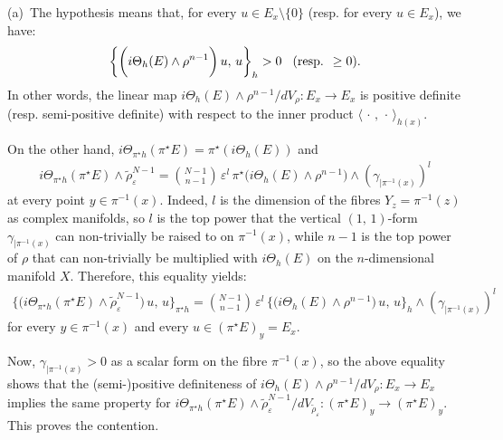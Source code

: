 \documentclass[12pt]{article}
\begin{document}
 (a)\, The hypothesis means that, for every $u\in E_x\setminus\{0\}$ (resp. for every $u\in E_x$), we have: \begin{eqnarray*}\bigg\{\bigg(i\Theta_h(E)\wedge\rho^{n-1}\bigg)\,u,\,u\bigg\}_h>0 \hspace{2ex} (\mbox{resp.} \hspace{1ex} \geq 0).\end{eqnarray*} In other words, the linear map $i\Theta_h(E)\wedge\rho^{n-1}/dV_\rho:E_x\longrightarrow E_x$ is positive definite (resp. semi-positive definite) with respect to the inner product $\langle\,\cdot\,,\,\cdot\,\rangle_{h(x)}$.

On the other hand, $i\Theta_{\pi^\star h}(\pi^\star E) = \pi^\star(i\Theta_h(E))$ and \begin{eqnarray*}i\Theta_{\pi^\star h}(\pi^\star E)\wedge\tilde\rho_\varepsilon^{N-1} = {N-1 \choose n-1}\,\varepsilon^l\,\pi^\star\bigg(i\Theta_h(E)\wedge\rho^{n-1}\bigg)\wedge(\gamma_{|\pi^{-1}(x)})^l\end{eqnarray*} at every point $y\in\pi^{-1}(x)$. Indeed, $l$ is the dimension of the fibres $Y_z=\pi^{-1}(z)$ as complex manifolds, so $l$ is the top power that the vertical $(1,\,1)$-form $\gamma_{|\pi^{-1}(x)}$ can non-trivially be raised to on $\pi^{-1}(x)$, while $n-1$ is the top power of $\rho$ that can non-trivially be multiplied with $i\Theta_h(E)$ on the $n$-dimensional manifold $X$. Therefore, this equality yields: \begin{eqnarray*}\bigg\{\bigg(i\Theta_{\pi^\star h}(\pi^\star E)\wedge\tilde\rho_\varepsilon^{N-1}\bigg)\,u,\,u\bigg\}_{\pi^\star h} =  {N-1 \choose n-1}\,\varepsilon^l\,\bigg\{\bigg(i\Theta_h(E)\wedge\rho^{n-1}\bigg)\,u,\,u\bigg\}_h\wedge(\gamma_{|\pi^{-1}(x)})^l\end{eqnarray*} for every $y\in\pi^{-1}(x)$ and every $u\in(\pi^\star E)_y = E_x$.

    Now, $\gamma_{|\pi^{-1}(x)}>0$ as a scalar form on the fibre $\pi^{-1}(x)$, so the above equality shows that the (semi-)positive definiteness of $i\Theta_h(E)\wedge\rho^{n-1}/dV_\rho:E_x\longrightarrow E_x$ implies the same property for $i\Theta_{\pi^\star h}(\pi^\star E)\wedge\tilde\rho_\varepsilon^{N-1}/dV_{\tilde\rho_\varepsilon}:(\pi^\star E)_y\longrightarrow(\pi^\star E)_y$. This proves the contention.

    \vspace{1ex}
\end{document}
